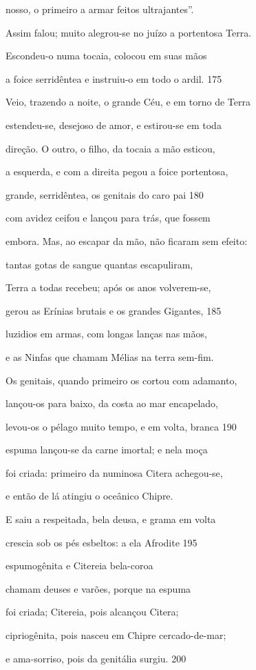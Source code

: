 nosso, o primeiro a armar feitos ultrajantes''.

\quad{}Assim falou; muito alegrou-se no juízo a portentosa Terra.

Escondeu-o numa tocaia, colocou em suas mãos

a foice serridêntea e instruiu-o em todo o ardil. \num{175}

Veio, trazendo a noite, o grande Céu, e em torno de Terra

estendeu-se, desejoso de amor, e estirou-se em toda

direção. O outro, o filho, da tocaia a mão esticou,

a esquerda, e com a direita pegou a foice portentosa,

grande, serridêntea, os genitais do caro pai \num{180}

com avidez ceifou e lançou para trás, que fossem

embora. Mas, ao escapar da mão, não ficaram sem efeito:

tantas gotas de sangue quantas escapuliram,

Terra a todas recebeu; após os anos volverem-se,

gerou as Erínias brutais e os grandes Gigantes, \num{185}

luzidios em armas, com longas lanças nas mãos,

e as Ninfas que chamam Mélias na terra sem-fim.

Os genitais, quando primeiro os cortou com adamanto,

lançou-os para baixo, da costa ao mar encapelado,

levou-os o pélago muito tempo, e em volta, branca \num{190}

espuma lançou-se da carne imortal; e nela moça

foi criada: primeiro da numinosa Citera achegou-se,

e então de lá atingiu o oceânico Chipre.

E saiu a respeitada, bela deusa, e grama em volta

crescia sob os pés esbeltos: a ela Afrodite \num{195}

espumogênita e Citereia bela-coroa

chamam deuses e varões, porque na espuma

foi criada; Citereia, pois alcançou Citera;

cipriogênita, pois nasceu em Chipre cercado-de-mar;

e ama-sorriso, pois da genitália surgiu. \num{200}

